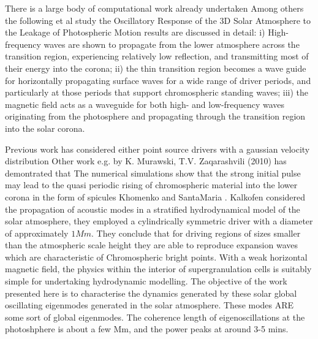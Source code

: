 \documentclass{aa}
\begin{document}
There is a large body of computational work already undertaken Among others the following \cite{Fedun2009} et al study the Oscillatory Response of the 3D Solar Atmosphere to the Leakage of Photospheric Motion results are discussed in detail: i) High-frequency waves are shown to propagate from the lower atmosphere across the transition region, experiencing relatively low reflection, and transmitting most of their energy into the corona; ii) the thin transition region becomes a wave guide for horizontally propagating surface waves for a wide range of driver periods, and particularly at those periods that support chromospheric standing waves; iii) the magnetic field acts as a waveguide for both high- and low-frequency waves originating from the photosphere and propagating through the transition region into the solar corona.


Previous work has considered either point source drivers with a gaussian velocity distribution Other work e.g. by K. Murawski, T.V. Zaqarashvili (2010) \cite{Murawski2010} has demontrated that The numerical simulations show that the strong initial pulse may lead to the quasi periodic rising of chromospheric material into the lower corona in the form of spicules Khomenko and SantaMaria \cite{Khomenko2012}. Kalkofen \cite{Kalkofen2010} considered the propagation of acoustic modes in a stratified hydrodynamical model of the solar atmosphere, they employed a cylindrically symmetric driver with a diameter of approximately $1Mm$. They conclude that for driving regions of sizes smaller than the atmospheric scale height they are able to reproduce expansion waves which are characteristic of Chromospheric bright points. With a weak horizontal magnetic field, the physics within the interior of supergranulation cells \cite{Lites2008} is suitably simple for undertaking hydrodynamic modelling. The objective of the work presented here  is to characterise the dynamics generated by these solar global oscillating eigenmodes generated in the solar atmosphere.  These modes ARE some sort of global eigenmodes. The coherence length of eigenoscillations at the photoshphere is about a few Mm, and the power peaks at around 3-5 mins. 
\end{document}
